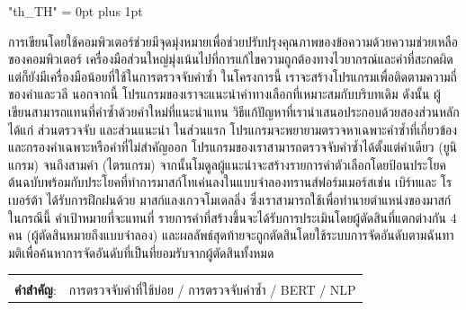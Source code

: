 \documentclass[12pt,oneside,openright,a4paper]{cpe-english-project}
\begin{document}
{
\XeTeXlinebreaklocale "th_TH"	
\XeTeXlinebreakskip = 0pt plus 1pt
\thaifont
\thaiabstract

การเขียนโดยใช้คอมพิวเตอร์ช่วยมีจุดมุ่งหมายเพื่อช่วยปรับปรุงคุณภาพของข้อความด้วยความช่วยเหลือของคอมพิวเตอร์ เครื่องมือส่วนใหญ่มุ่งเน้นไปที่การแก้ไขความถูกต้องทางไวยากรณ์และคำที่สะกดผิด แต่ก็ยังมีเครื่องมือน้อยที่ใช้ในการตรวจจับคำซ้ำ ในโครงการนี้ เราจะสร้างโปรแกรมเพื่อติดตามความถี่ของคำและวลี นอกจากนี้ โปรแกรมของเราจะแนะนำคำทางเลือกที่เหมาะสมกับบริบทเดิม ดังนั้น ผู้เขียนสามารถแทนที่คำซ้ำด้วยคำใหม่ที่แนะนำแทน วิธีแก้ปัญหาที่เรานำเสนอประกอบด้วยสองส่วนหลัก ได้แก่ ส่วนตรวจจับ และส่วนแนะนำ ในส่วนแรก โปรแกรมจะพยายามตรวจหาเฉพาะคำซ้ำที่เกี่ยวข้องและกรองคำเฉพาะหรือคำที่ไม่สำคัญออก โปรแกรมของเราสามารถตรวจจับคำซ้ำได้ตั้งแต่คำเดียว (ยูนิแกรม) จนถึงสามคำ (ไตรแกรม) จากนั้นโมดูลผู้แนะนำจะสร้างรายการคำตัวเลือกโดยป้อนประโยคต้นฉบับพร้อมกับประโยคที่ทำการมาสก์โทเค่นลงในแบบจำลองทรานส์ฟอร์มเมอร์สเช่น เบิร์ทและ โรเบอร์ต้า ได้รับการฝึกฝนด้วย มาสก์แลงเกวจโมเดลลิ่ง ซึ่งเราสามารถใช้เพื่อทำนายตำแหน่งของมาสก์ ในกรณีนี้ คำเป้าหมายที่จะแทนที่ รายการคำที่สร้างขึ้นจะได้รับการประเมินโดยผู้ตัดสินที่แตกต่างกัน 4 คน (ผู้ตัดสินหมายถึงแบบจำลอง) และผลลัพธ์สุดท้ายจะถูกตัดสินโดยใช้ระบบการจัดอันดับตามฉันทามติเพื่อค้นหาการจัดอันดับที่เป็นที่ยอมรับจากผู้ตัดสินทั้งหมด

\begin{flushleft}
\begin{tabular*}{\textwidth}{@{}lp{}}
 & \\

\textbf{คำสำคัญ}: & การตรวจจับคำที่ใช้บ่อย / การตรวจจับคำซ้ำ / BERT / NLP
\end{tabular*}
\end{flushleft}
\endabstract
}

%

\tableofcontents                    
\listoffigures                      
\end{document}
